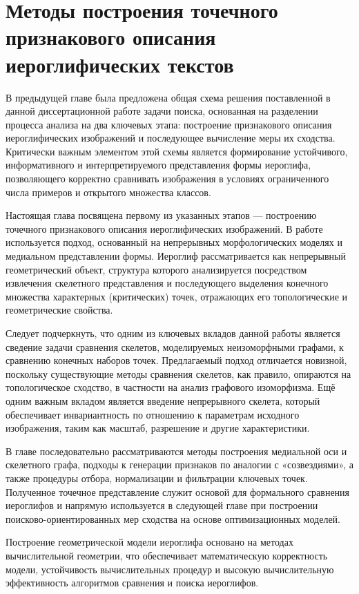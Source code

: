 \chapter{Методы построения точечного признакового описания иероглифических текстов}\label{ch:ch3}
В предыдущей главе была предложена общая схема решения поставленной в данной диссертационной работе задачи поиска, основанная на разделении процесса анализа на два ключевых этапа: построение признакового описания иероглифических изображений и последующее вычисление меры их сходства. Критически важным элементом этой схемы является формирование устойчивого, информативного и интерпретируемого представления формы иероглифа, позволяющего корректно сравнивать изображения в условиях ограниченного числа примеров и открытого множества классов.

Настоящая глава посвящена первому из указанных этапов — построению точечного признакового описания иероглифических изображений. В работе используется подход, основанный на непрерывных морфологических моделях и медиальном представлении формы. Иероглиф рассматривается как непрерывный геометрический объект, структура которого анализируется посредством извлечения скелетного представления и последующего выделения конечного множества характерных (критических) точек, отражающих его топологические и геометрические свойства.

Следует подчеркнуть, что одним из ключевых вкладов данной работы является сведение задачи сравнения скелетов, моделируемых неизоморфными графами, к сравнению конечных наборов точек. Предлагаемый подход отличается новизной, поскольку существующие методы сравнения скелетов, как правило, опираются на топологическое сходство, в частности на анализ графового изоморфизма. Ещё одним важным вкладом является введение непрерывного скелета, который обеспечивает инвариантность по отношению к параметрам исходного изображения, таким как масштаб, разрешение и другие характеристики.

В главе последовательно рассматриваются методы построения медиальной оси и скелетного графа, подходы к генерации признаков по аналогии с «созвездиями», а также процедуры отбора, нормализации и фильтрации ключевых точек. Полученное точечное представление служит основой для формального сравнения иероглифов и напрямую используется в следующей главе при построении поисково-ориентированных мер сходства на основе оптимизационных моделей.

Построение геометрической модели иероглифа основано на методах вычислительной геометрии, что обеспечивает математическую корректность модели, устойчивость вычислительных процедур и высокую вычислительную эффективность алгоритмов сравнения и поиска иероглифов.


